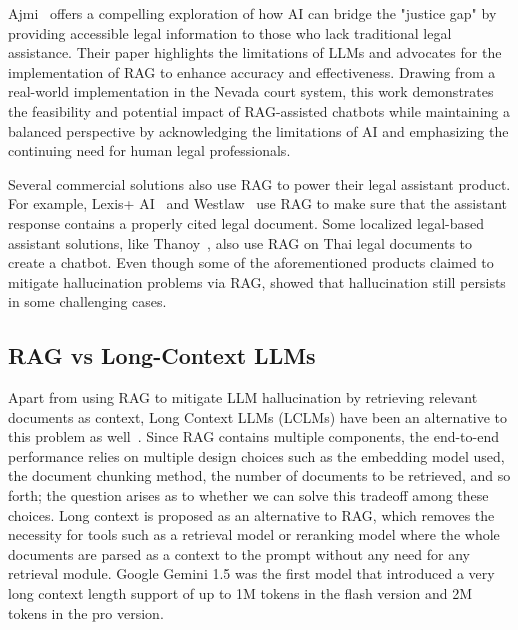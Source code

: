 Ajmi~\cite{Ajmi2024} offers a compelling exploration of how AI can bridge the "justice gap" by providing accessible legal information to those who lack traditional legal assistance. 
%
Their paper highlights the limitations of LLMs and advocates for the implementation of RAG to enhance accuracy and effectiveness. 
%
Drawing from a real-world implementation in the Nevada court system, this work demonstrates the feasibility and potential impact of RAG-assisted chatbots while maintaining a balanced perspective by acknowledging the limitations of AI and emphasizing the continuing need for human legal professionals.

Several commercial solutions also use RAG to power their legal assistant product.
%
For example, Lexis+ AI~\cite{lexisnexis} and Westlaw~\cite{thomsonreutersAIpoweredLegal} use RAG to make sure that the assistant response contains a properly cited legal document. 
%
Some localized legal-based assistant solutions, like Thanoy~\cite{thanoy}, also use RAG on Thai legal documents to create a chatbot. 
%
{Even though some of the aforementioned products claimed to mitigate hallucination problems via RAG, \cite{magesh2024hallucinationfreeassessingreliabilityleading} showed that hallucination still persists in some challenging cases.}


\subsection{RAG vs Long-Context LLMs}

{
Apart from using RAG to mitigate LLM hallucination by retrieving relevant documents as context, Long Context LLMs (LCLMs) have been an alternative to this problem as well~\cite{laban2024summaryhaystackchallengelongcontext, loft}. 
%
Since RAG contains multiple components, the end-to-end performance relies on multiple design choices such as the embedding model used, the document chunking method, the number of documents to be retrieved, and so forth; the question arises as to whether we can solve this tradeoff among these choices. 
%
Long context is proposed as an alternative to RAG, which removes the necessity for tools such as a retrieval model or reranking model where the whole documents are parsed as a context to the prompt without any need for any retrieval module.
%
Google Gemini 1.5 \cite{gemini1.5} was the first model that introduced a very long context length support of up to 1M tokens in the flash version and 2M tokens in the pro version. 

}

